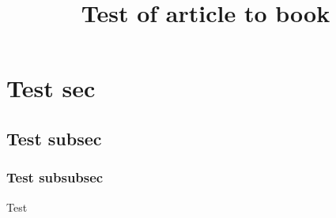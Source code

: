 \documentclass{article}
\title{Test of article to book}
\begin{document}
    \tableofcontents
    
    
    
    \section{Test sec}
    \subsection{Test subsec}
    \subsubsection{Test subsubsec}
    Test
\end{document}
